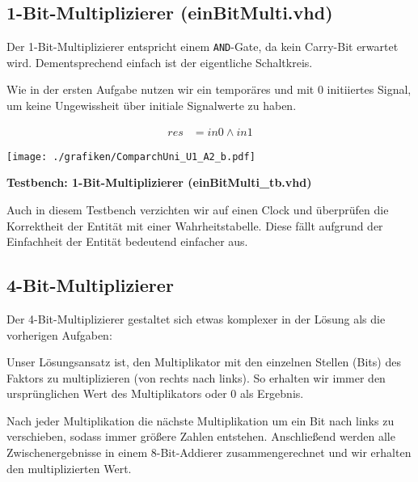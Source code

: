 \documentclass{pi3}
\begin{document}




\subsection{1-Bit-Multiplizierer (einBitMulti.vhd)}

Der 1-Bit-Multiplizierer entspricht einem \texttt{AND}-Gate, da kein Carry-Bit erwartet wird. Dementsprechend einfach ist der eigentliche Schaltkreis.

Wie in der ersten Aufgabe nutzen wir ein temporäres und mit 0 initiiertes Signal, um keine Ungewissheit über initiale Signalwerte zu haben.

\begin{align*}
res &= in0 \wedge in1
\end{align*}

\begin{center}
	\texttt{[image: ./grafiken/ComparchUni\_U1\_A2\_b.pdf]}
\end{center} 



\textbf{Testbench: 1-Bit-Multiplizierer (einBitMulti\_tb.vhd)}

Auch in diesem Testbench verzichten wir auf einen Clock und überprüfen die Korrektheit der Entität mit einer
Wahrheitstabelle. Diese fällt aufgrund der Einfachheit der Entität bedeutend einfacher aus.




\subsection{4-Bit-Multiplizierer}

Der 4-Bit-Multiplizierer gestaltet sich etwas komplexer in der Lösung als die vorherigen Aufgaben:

Unser Lösungsansatz ist, den Multiplikator mit den einzelnen Stellen (Bits) des Faktors zu multiplizieren (von rechts nach links). So erhalten wir immer den ursprünglichen Wert des Multiplikators oder 0 als Ergebnis.

Nach jeder Multiplikation die nächste Multiplikation um ein Bit nach links zu verschieben, sodass immer größere Zahlen entstehen. Anschließend werden alle Zwischenergebnisse in einem 8-Bit-Addierer zusammengerechnet und wir erhalten den multiplizierten Wert.
\end{document}
